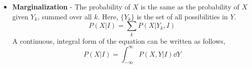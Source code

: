 \documentclass[a4paper,11pt]{article}
\begin{document}
\begin{itemize}
	\item \textbf{Marginalization} - The probability of $ X $ is the same as the probability of $ X $ given $ Y_k $, summed over all $ k $. Here, $ \{Y_k\} $ is the set of all possibilities in $ Y $.
	\begin{equation*}
	P(X| I) = \sum_k P(X|Y_k, I)
	\end{equation*}
	A continuous, integral form of the equation can be written as follows,
	\begin{equation*}
	P(X|I) = \int_{-\infty}^\infty P(X,Y|I) \dd{Y} 
	\end{equation*}
\end{itemize}
\end{document}
